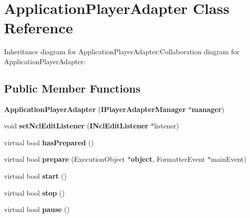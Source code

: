\section{ApplicationPlayerAdapter Class Reference}
\label{classbr_1_1pucrio_1_1telemidia_1_1ginga_1_1ncl_1_1adapters_1_1application_1_1ApplicationPlayerAdapter}
Inheritance diagram for ApplicationPlayerAdapter:Collaboration diagram for ApplicationPlayerAdapter:\subsection*{Public Member Functions}
\begin{CompactItemize}
\item 
\textbf{ApplicationPlayerAdapter} ({\bf IPlayerAdapterManager} $\ast${\bf manager})\label{classbr_1_1pucrio_1_1telemidia_1_1ginga_1_1ncl_1_1adapters_1_1application_1_1ApplicationPlayerAdapter_44f4106e61d37cfea7c1de6fb6439ae4}

\item 
void \textbf{setNclEditListener} ({\bf INclEditListener} $\ast$listener)\label{classbr_1_1pucrio_1_1telemidia_1_1ginga_1_1ncl_1_1adapters_1_1application_1_1ApplicationPlayerAdapter_c93507f3caf7d9f57e8dc4f55f824fe5}

\item 
virtual bool \textbf{hasPrepared} ()\label{classbr_1_1pucrio_1_1telemidia_1_1ginga_1_1ncl_1_1adapters_1_1application_1_1ApplicationPlayerAdapter_54fc8af2d22bee49a7858c6e0df829db}

\item 
virtual bool \textbf{prepare} (ExecutionObject $\ast${\bf object}, FormatterEvent $\ast$mainEvent)\label{classbr_1_1pucrio_1_1telemidia_1_1ginga_1_1ncl_1_1adapters_1_1application_1_1ApplicationPlayerAdapter_96d0bce73b715f0a6fe5dedf903a5529}

\item 
virtual bool \textbf{start} ()\label{classbr_1_1pucrio_1_1telemidia_1_1ginga_1_1ncl_1_1adapters_1_1application_1_1ApplicationPlayerAdapter_2a1dbe283ac44900c920f3f79339f9f6}

\item 
virtual bool \textbf{stop} ()\label{classbr_1_1pucrio_1_1telemidia_1_1ginga_1_1ncl_1_1adapters_1_1application_1_1ApplicationPlayerAdapter_3d0f1501fa4ccfb9e3f868ab4a185856}

\item 
virtual bool \textbf{pause} ()\label{classbr_1_1pucrio_1_1telemidia_1_1ginga_1_1ncl_1_1adapters_1_1application_1_1ApplicationPlayerAdapter_1bb2a8fd099734a2a6d1cab9fbca1939}


\end{CompactItemize}

